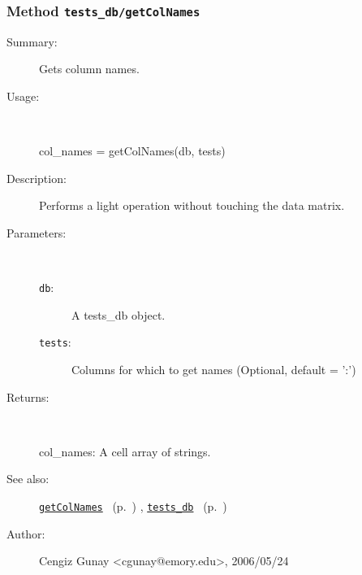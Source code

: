 \subsubsection[Method \texttt{getColNames}]{Method \texttt{tests\_db/getColNames}}%
%
\label{ref_tests_db__getColNames}%
\hypertarget{ref_tests_db__getColNames}{}%
\begin{description}
\item[Summary:]Gets column names.
%
\item[Usage:]~%
\begin{lyxcode}%
col\_names = getColNames(db, tests)
%
\end{lyxcode}%
%
\item[Description:]%
Performs a light operation without touching the data matrix.
\item[Parameters:]~
\begin{description}%
\item[\texttt{db}:]
 A tests\_db object.
\item[\texttt{tests}:]
 Columns for which to get names (Optional, default = ':')
\end{description}%
%
\item[Returns:]~

	col\_names: A cell array of strings.
%
%
\item[See also:]%
\hyperlink{ref_getColNames}{\texttt{getColNames}}%
\ (p.~\pageref{ref_getColNames})%
%
, \hyperlink{ref_tests_db}{\texttt{tests\_db}}%
\ (p.~\pageref{ref_tests_db})%
%
%
\item[Author:]%
Cengiz Gunay <cgunay@emory.edu>, 2006/05/24%
\end{description}
\methodline%
